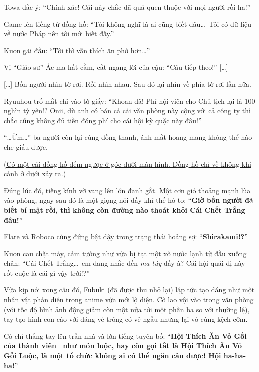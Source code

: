 \documentclass[../main.tex]{subfiles}
\begin{document}
Towa đắc ý: ``Chính xác! Cái này chắc đã quá quen thuộc với mọi người rồi ha!''

Game lên tiếng từ đồng hồ: ``Tôi không nghĩ là ai cũng biết đâu\dots\ Tôi có dữ liệu về nước Pháp nên tôi mới biết đấy.''

Kuon gãi đầu: ``Tôi thì vẫn thích ăn phở hơn\dots''

Vị ``Giáo sư'' Ác ma hất cằm, cắt ngang lời của cậu: ``Câu tiếp theo!'' [\dots]


[\dots] Bốn người nhìn tờ rơi. Rồi nhìn nhau. Sau đó lại nhìn về phía tờ rơi lần nữa.

Ryuuhou trố mắt chỉ vào tờ giấy: ``Khoan đã! Phí hội viên cho Chủ tịch lại là 100 nghìn tỷ yên!? Onii, dù anh có bán cả cái văn phòng này cộng với cả công ty thì chắc cũng không đủ tiền đóng phí cho cái hội kỳ quặc này đâu!''

``\dots Ừm\dots'' ba người còn lại cùng đồng thanh, ánh mắt hoang mang không thể nào che giấu được.

\begin{center}
  \uline{(Có một cái đồng hồ đếm ngược ở góc dưới màn hình. Đồng hồ chỉ về không khi cảnh ở dưới xảy ra.)}
\end{center}

Đúng lúc đó, tiếng kính vỡ vang lên lớn đanh gắt. Một cơn gió thoảng mạnh lùa vào phòng, ngay sau đó là một giọng nói đầy khí thế hô to: ``\textbf{Giờ bốn người đã biết bí mật rồi, thì không còn đường nào thoát khỏi Cái Chết Trắng đâu!}''

Flare và Roboco cùng đứng bật dậy trong trạng thái hoảng sợ: ``\textbf{Shirakami!?}''

Kuon cau chặt mày, cảm tưởng như vừa bị tạt một xô nước lạnh từ đầu xuống chân: ``Cái Chết Trắng\dots\ em đang nhắc đến \emph{ma túy} đấy à? Cái hội quái dị này rốt cuộc là cái gì vậy trời!?''

Vừa kịp nói xong câu đó, Fubuki (đã được thu nhỏ lại) lập tức tạo dáng như một nhân vật phản diện trong anime vừa mới lộ diện. Cô lao vội vào trong văn phòng (với tốc độ hình ảnh động giảm còn một nửa tới một phần ba so với thường lệ), tay tạo hình con cáo với dáng vẻ trông có vẻ ngầu nhưng lại vô cùng kệch cỡm.


Cô chỉ thẳng tay lên trần nhà và lớn tiếng tuyên bố: ``\textbf{Hội Thích Ăn Vỏ Gối của thành viên \hll\ như món luộc, hay còn gọi tắt là Hội Thích Ăn Vỏ Gối Luộc, là một tổ chức không ai có thể ngăn cản được! Hội ha-ha-ha!}''
\end{document}
